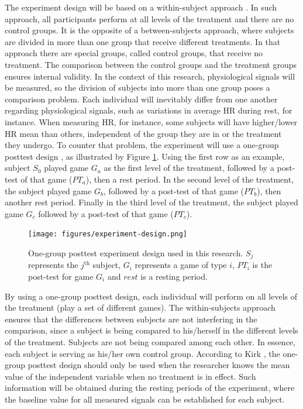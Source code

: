 The experiment design will be based on a within-subject approach \cite{lane2015online}. In such approach, all participants perform at all levels of the treatment and there are no control groups. It is the opposite of a between-subjects approach, where subjects are divided in more than one group that receive different treatments. In that approach there are special groups, called control groups, that receive no treatment. The comparison between the control groups and the treatment groups ensures internal validity. In the context of this research, physiological signals will be measured, so the division of subjects into more than one group poses a comparison problem. Each individual will inevitably differ from one another regarding physiological signals, such as variations in average HR during rest, for instance. When measuring HR, for instance, some subjects will have higher/lower HR mean than others, independent of the group they are in or the treatment they undergo. To counter that problem, the experiment will use a one-group posttest design \cite{kirk1982experimental}, as illustrated by Figure \ref{fig:experiment}. Using the first row as an example, subject $S_0$ played game $G_a$ as the first level of the treatment, followed by a post-test of that game ($PT_a$), then a rest period. In the second level of the treatment, the subject played game $G_b$, followed by a post-test of that game ($PT_b$), then another rest period. Finally in the third level of the treatment, the subject played game $G_c$ followed by a post-test of that game ($PT_c$).

\begin{figure}[ht]
    \centering
    \texttt{[image: figures/experiment-design.png]}
    \caption{One-group posttest experiment design used in this research. $S_j$ represents the $j^{\text{th}}$ subject, $G_i$ represents a game of type $i$, $PT_i$ is the post-test for game $G_i$ and $rest$ is a resting period.}
    \label{fig:experiment}
\end{figure}

By using a one-group posttest design, each individual will perform on all levels of the treatment (play a set of different games). The within-subjects approach ensures that the differences between subjects are not interfering in the comparison, since a subject is being compared to his/herself in the different levels of the treatment. Subjects are not being compared among each other. In essence, each subject is serving as his/her own control group. According to Kirk \cite{kirk1982experimental}, the one-group posttest design should only be used when the researcher knows the mean value of the independent variable when no treatment is in effect. Such information will be obtained during the resting periods of the experiment, where the baseline value for all measured signals can be established for each subject.

